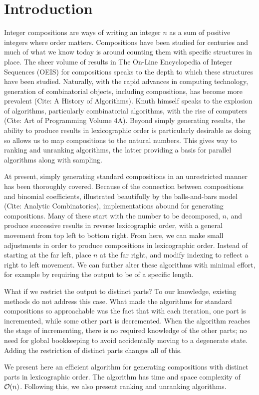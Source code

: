 \section{Introduction}
\label{sec:introduction}

Integer compositions are ways of writing an integer $n$ as a sum of positive integers where order matters. Compositions have been studied for centuries and much of what we know today is around counting them with specific structures in place. The sheer volume of results in The On-Line Encyclopedia of Integer Sequences (OEIS) for compositions speaks to the depth to which these structures have been studied. Naturally, with the rapid advances in computing technology, generation of combinatorial objects, including compositions, has become more prevalent (Cite: A History of Algorithms). Knuth himself speaks to the explosion of algorithms, particularly combinatorial algorithms, with the rise of computers (Cite: Art of Programming Volume 4A). Beyond simply generating results, the ability to produce results in lexicographic order is particularly desirable as doing so allows us to map compositions to the natural numbers. This gives way to ranking and unranking algorithms, the latter providing a basis for parallel algorithms along with sampling.

At present, simply generating standard compositions in an unrestricted manner has been thoroughly covered. Because of the connection between compositions and binomial coefficients, illustrated beautifully by the balls-and-bars model (Cite: Analytic Combinatorics), implementations abound for generating compositions. Many of these start with the number to be decomposed, $n$, and produce successive results in reverse lexicographic order, with a general movement from top left to bottom right. From here, we can make small adjustments in order to produce compositions in lexicographic order. Instead of starting at the far left, place $n$ at the far right, and modify indexing to reflect a right to left movement. We can further alter these algorithms with minimal effort, for example by requiring the output to be of a specific length.

What if we restrict the output to distinct parts? To our knowledge, existing methods do not address this case. What made the algorithms for standard compositions so approachable was the fact that with each iteration, one part is incremented, while some other part is decremented. When the algorithm reaches the stage of incrementing, there is no required knowledge of the other parts; no need for global bookkeeping to avoid accidentally moving to a degenerate state. Adding the restriction of distinct parts changes all of this.

We present here an efficient algorithm for generating compositions with distinct parts in lexicographic order. The algorithm has time and space complexity of $\mathcal{O}(n)$. Following this, we also present ranking and unranking algorithms.
